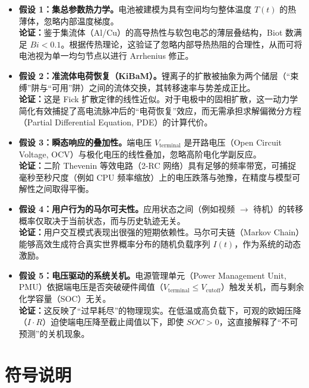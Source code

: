 \documentclass[11pt,a4paper]{ctexart}
\begin{document}
\begin{itemize}[leftmargin=1.6em,itemsep=0.5em]
\item \textbf{假设 1：集总参数热力学。}电池被建模为具有空间均匀整体温度 $T(t)$ 的热薄体，忽略内部温度梯度。\\\textbf{论证：}鉴于集流体（Al/Cu）的高导热性与软包电芯的薄层叠结构，Biot 数满足 $Bi < 0.1$。根据传热理论，这验证了忽略内部导热热阻的合理性，从而可将电池视为单一均匀节点以进行 Arrhenius 修正。

\item \textbf{假设 2：准流体电荷恢复（KiBaM）。}锂离子的扩散被抽象为两个储层（“束缚”阱与“可用”阱）之间的流体交换，其转移速率与势差成正比。\\\textbf{论证：}这是 Fick 扩散定律的线性近似。对于电极中的固相扩散，这一动力学简化有效捕捉了高电流脉冲后的“电荷恢复”效应，而无需承担求解偏微分方程（Partial Differential Equation, PDE）的计算代价。

\item \textbf{假设 3：瞬态响应的叠加性。}端电压 $V_{\text{terminal}}$ 是开路电压（Open Circuit Voltage, OCV）与极化电压的线性叠加，忽略高阶电化学副反应。\\\textbf{论证：}二阶 Thevenin 等效电路（2-RC 网络）具有足够的频率带宽，可捕捉毫秒至秒尺度（例如 CPU 频率缩放）上的电压跌落与弛豫，在精度与模型可解性之间取得平衡。

\item \textbf{假设 4：用户行为的马尔可夫性。}应用状态之间（例如视频 $\rightarrow$ 待机）的转移概率仅取决于当前状态，而与历史轨迹无关。\\\textbf{论证：}用户交互模式表现出很强的短期依赖性。马尔可夫链（Markov Chain）能够高效生成符合真实世界概率分布的随机负载序列 $I(t)$，作为系统的动态激励。

\item \textbf{假设 5：电压驱动的系统关机。}电源管理单元（Power Management Unit, PMU）依据端电压是否突破硬件阈值（$V_{\text{terminal}} \le V_{\text{cutoff}}$）触发关机，而与剩余化学容量（SOC）无关。\\\textbf{论证：}这反映了“过早耗尽”的物理现实。在低温或高负载下，可观的欧姆压降（$I \cdot R$）迫使端电压降至截止阈值以下，即使 $SOC > 0$，这直接解释了“不可预测”的关机现象。
\end{itemize}

\section{符号说明}
\enlargethispage{2\baselineskip}
\end{document}
